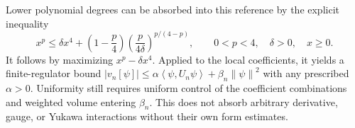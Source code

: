 \documentclass[11pt,a4paper,oneside]{book}
\theoremstyle{plain}
\theoremstyle{definition}
\theoremstyle{remark}
\newcommand{\norm}[1]{\left\lVert#1\right\rVert}
\newcommand{\pair}[2]{\left\langle#1,#2\right\rangle}
\newcommand{\src}[2]{\cite{#1}}
\begin{document}
Lower polynomial degrees can be absorbed into this reference by the
explicit inequality
\begin{equation}
 x^p\le\delta x^4+
 \left(1-\frac p4\right)
 \left(\frac{p}{4\delta}\right)^{p/(4-p)},
 \qquad 0<p<4,\quad\delta>0,\quad x\ge0.
 \label{eq:quartic-absorption}
\end{equation}
It follows by maximizing $x^p-\delta x^4$.  Applied to the local
coefficients, it yields a finite-regulator bound
$|v_n[\psi]|\le\alpha\pair\psi{U_n\psi}+\beta_n\norm\psi^2$ with any
prescribed $\alpha>0$.  Uniformity still requires uniform control of the
coefficient combinations and weighted volume entering $\beta_n$.
This does not absorb arbitrary derivative, gauge, or Yukawa interactions
without their own form estimates.
\src{R15}{lem:v15v93-young,thm:v15v93-polynomial}
\end{document}
